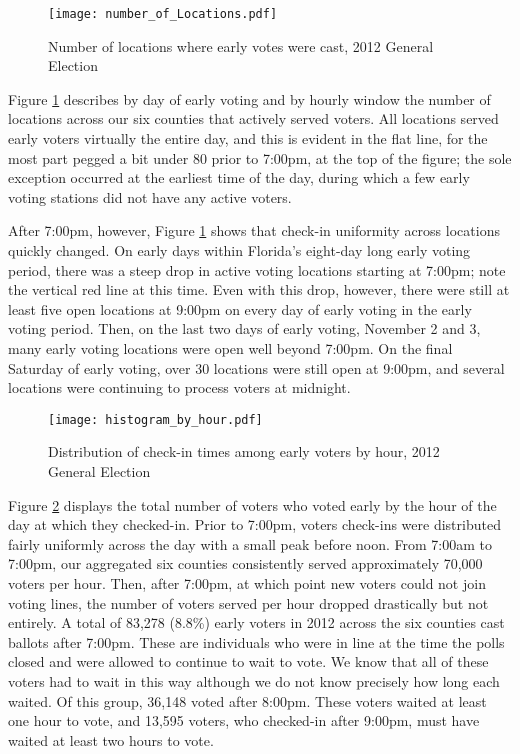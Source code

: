 \documentclass[12pt,titlepage]{article}
\begin{document}


\begin{figure}[!ht]
  \caption{Number of locations where early votes were cast, 2012
    General Election}
  \label{fig:nrlocs2012}
  \centering
    \centering\texttt{[image: number\_of\_Locations.pdf]}
\end{figure}

Figure \ref{fig:nrlocs2012} describes by day of early voting and by
hourly window the number of locations across our six counties that
actively served voters.  All locations served early voters virtually
the entire day, and this is evident in the flat line, for the most
part pegged a bit under 80 prior to 7:00pm, at the top of the figure;
the sole exception occurred at the earliest time of the day, during
which a few early voting stations did not have any active voters.

After 7:00pm, however, Figure \ref{fig:nrlocs2012} shows that check-in
uniformity across locations quickly changed.  On early days within
Florida's eight-day long early voting period, there was a steep drop
in active voting locations starting at 7:00pm; note the vertical red
line at this time.  Even with this drop, however, there were still at
least five open locations at 9:00pm on every day of early voting in
the early voting period.  Then, on the last two days of early voting,
November 2 and 3, many early voting locations were open well beyond
7:00pm.  On the final Saturday of early voting, over 30 locations were
still open at 9:00pm, and several locations were continuing to process
voters at midnight.

\begin{figure}[!ht]
\caption{Distribution of check-in times among early voters by hour, 2012
  General Election}
  \label{fig:hist2012}
  \centering
    \centering\texttt{[image: histogram\_by\_hour.pdf]}
\end{figure}

Figure \ref{fig:hist2012} displays the total number of voters who
voted early by the hour of the day at which they checked-in. Prior to
7:00pm, voters check-ins were distributed fairly uniformly across the
day with a small peak before noon.  From 7:00am to 7:00pm, our
aggregated six counties consistently served approximately 70,000
voters per hour. Then, after 7:00pm, at which point new voters could
not join voting lines, the number of voters served per hour dropped
drastically but not entirely.  A total of 83,278 (8.8\%) early voters
in 2012 across the six counties cast ballots after 7:00pm. These are individuals who were in
line at the time the polls closed and were allowed to continue to wait
to vote.  We know that all of these voters had to wait in this way
although we do not know precisely how long each waited.  Of this
group, 36,148 voted after 8:00pm.  These voters waited at least one
hour to vote, and 13,595 voters, who checked-in after 9:00pm, must
have waited at least two hours to vote.
\end{document}
